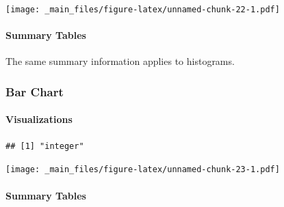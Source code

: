 \documentclass[
]{book}
\newenvironment{Shaded}{\begin{snugshade}}{\end{snugshade}}
\newcommand{\FunctionTok}[1]{\textcolor[rgb]{0.13,0.29,0.53}{\textbf{#1}}}
\newcommand{\NormalTok}[1]{#1}
\newcommand{\SpecialCharTok}[1]{\textcolor[rgb]{0.81,0.36,0.00}{\textbf{#1}}}
\begin{document}
\begin{Shaded}
\end{Shaded}

\texttt{[image: \_main\_files/figure-latex/unnamed-chunk-22-1.pdf]}

\hypertarget{summary-tables-1}{%
\paragraph{Summary Tables}\label{summary-tables-1}}

The same summary information applies to histograms.

\hypertarget{bar-chart}{%
\subsubsection{Bar Chart}\label{bar-chart}}

\hypertarget{visualizations-2}{%
\paragraph{Visualizations}\label{visualizations-2}}

\begin{Shaded}
\end{Shaded}

\begin{verbatim}
## [1] "integer"
\end{verbatim}

\begin{Shaded}
\end{Shaded}

\texttt{[image: \_main\_files/figure-latex/unnamed-chunk-23-1.pdf]}

\hypertarget{summary-tables-2}{%
\paragraph{Summary Tables}\label{summary-tables-2}}
\end{document}
